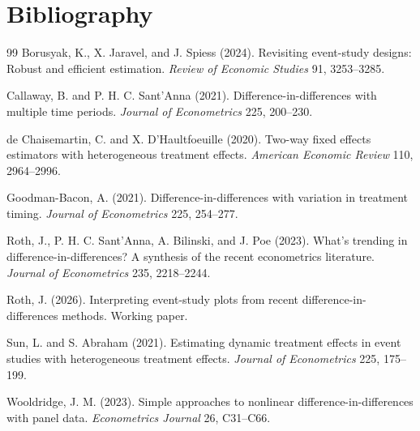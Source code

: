 \documentclass[11pt]{article}
\theoremstyle{definition}
\theoremstyle{plain}
\theoremstyle{remark}
\begin{document}
\section*{Bibliography}
\begin{thebibliography}{99}
Borusyak, K., X. Jaravel, and J. Spiess (2024). Revisiting event-study designs: Robust and efficient estimation. \emph{Review of Economic Studies} 91, 3253--3285.

Callaway, B. and P. H. C. Sant'Anna (2021). Difference-in-differences with multiple time periods. \emph{Journal of Econometrics} 225, 200--230.

de Chaisemartin, C. and X. D'Haultfoeuille (2020). Two-way fixed effects estimators with heterogeneous treatment effects. \emph{American Economic Review} 110, 2964--2996.

Goodman-Bacon, A. (2021). Difference-in-differences with variation in treatment timing. \emph{Journal of Econometrics} 225, 254--277.

Roth, J., P. H. C. Sant'Anna, A. Bilinski, and J. Poe (2023). What's trending in difference-in-differences? A synthesis of the recent econometrics literature. \emph{Journal of Econometrics} 235, 2218--2244.

Roth, J. (2026). Interpreting event-study plots from recent difference-in-differences methods. Working paper.

Sun, L. and S. Abraham (2021). Estimating dynamic treatment effects in event studies with heterogeneous treatment effects. \emph{Journal of Econometrics} 225, 175--199.

Wooldridge, J. M. (2023). Simple approaches to nonlinear difference-in-differences with panel data. \emph{Econometrics Journal} 26, C31--C66.
\end{thebibliography}
\end{document}
